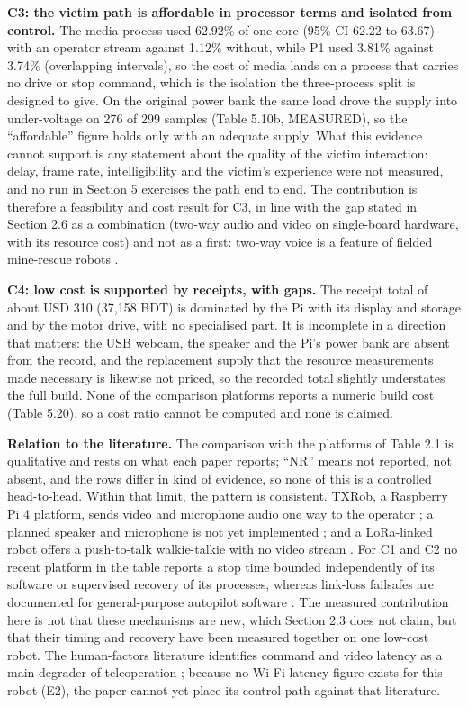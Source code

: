 \textbf{C3: the victim path is affordable in processor terms and isolated from control.} The media process used 62.92\% of one core (95\% CI 62.22 to 63.67) with an operator stream against 1.12\% without, while P1 used 3.81\% against 3.74\% (overlapping intervals), so the cost of media lands on a process that carries no drive or stop command, which is the isolation the three-process split is designed to give. On the original power bank the same load drove the supply into under-voltage on 276 of 299 samples (Table 5.10b, MEASURED), so the ``affordable'' figure holds only with an adequate supply. What this evidence cannot support is any statement about the quality of the victim interaction: delay, frame rate, intelligibility and the victim's experience were not measured, and no run in Section 5 exercises the path end to end. The contribution is therefore a feasibility and cost result for C3, in line with the gap stated in Section 2.6 as a combination (two-way audio and video on single-board hardware, with its resource cost) and not as a first: two-way voice is a feature of fielded mine-rescue robots \cite{bakzadeh2026}.

\textbf{C4: low cost is supported by receipts, with gaps.} The receipt total of about USD 310 (37,158 BDT) is dominated by the Pi with its display and storage and by the motor drive, with no specialised part. It is incomplete in a direction that matters: the USB webcam, the speaker and the Pi's power bank are absent from the record, and the replacement supply that the resource measurements made necessary is likewise not priced, so the recorded total slightly understates the full build. None of the comparison platforms reports a numeric build cost (Table 5.20), so a cost ratio cannot be computed and none is claimed.

\textbf{Relation to the literature.} The comparison with the platforms of Table 2.1 is qualitative and rests on what each paper reports; ``NR'' means not reported, not absent, and the rows differ in kind of evidence, so none of this is a controlled head-to-head. Within that limit, the pattern is consistent. TXRob, a Raspberry Pi 4 platform, sends video and microphone audio one way to the operator \cite{verano2022}; a planned speaker and microphone is not yet implemented \cite{khattab2025}; and a LoRa-linked robot offers a push-to-talk walkie-talkie with no video stream \cite{manuel2022}. For C1 and C2 no recent platform in the table reports a stop time bounded independently of its software or supervised recovery of its processes, whereas link-loss failsafes are documented for general-purpose autopilot software \cite{ardupilot_rover_failsafe}. The measured contribution here is not that these mechanisms are new, which Section 2.3 does not claim, but that their timing and recovery have been measured together on one low-cost robot. The human-factors literature identifies command and video latency as a main degrader of teleoperation \cite{chen2007}; because no Wi-Fi latency figure exists for this robot (E2), the paper cannot yet place its control path against that literature.


